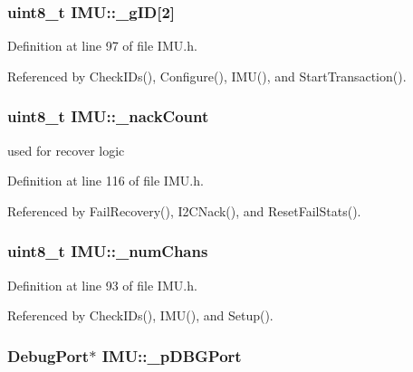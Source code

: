 \hypertarget{class_i_m_u_a47ffe20a032e3a890cd3891793a60a40}{
\subsubsection[{\_\-gID}]{\setlength{\rightskip}{0pt plus 5cm}uint8\_\-t {\bf IMU::\_\-gID}\mbox{[}2\mbox{]}}}
\label{class_i_m_u_a47ffe20a032e3a890cd3891793a60a40}


Definition at line 97 of file IMU.h.



Referenced by CheckIDs(), Configure(), IMU(), and StartTransaction().

\hypertarget{class_i_m_u_a30c8553ab21b5d6e618c2616f25dafb1}{
\subsubsection[{\_\-nackCount}]{\setlength{\rightskip}{0pt plus 5cm}uint8\_\-t {\bf IMU::\_\-nackCount}}}
\label{class_i_m_u_a30c8553ab21b5d6e618c2616f25dafb1}


used for recover logic 



Definition at line 116 of file IMU.h.



Referenced by FailRecovery(), I2CNack(), and ResetFailStats().

\hypertarget{class_i_m_u_a27df580b4559aaf3234469bfe16eb158}{
\subsubsection[{\_\-numChans}]{\setlength{\rightskip}{0pt plus 5cm}uint8\_\-t {\bf IMU::\_\-numChans}}}
\label{class_i_m_u_a27df580b4559aaf3234469bfe16eb158}


Definition at line 93 of file IMU.h.



Referenced by CheckIDs(), IMU(), and Setup().

\hypertarget{class_i_m_u_a83a2ffaf84cc04f17ff0301181c45366}{
\subsubsection[{\_\-pDBGPort}]{\setlength{\rightskip}{0pt plus 5cm}DebugPort$\ast$ {\bf IMU::\_\-pDBGPort}}}
\label{class_i_m_u_a83a2ffaf84cc04f17ff0301181c45366}


